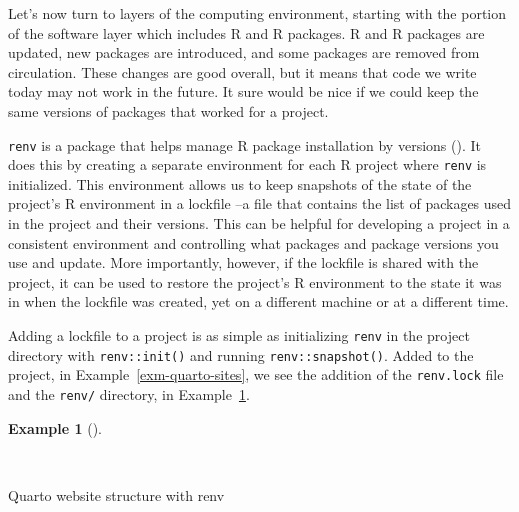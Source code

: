 \documentclass[
  letterpaper,
]{latex/krantz}
\theoremstyle{definition}
\newtheorem{example}{Example}[chapter]
\theoremstyle{remark}
\begin{document}
Let's now turn to layers of the computing environment, starting with the
portion of the software layer which includes R and R packages. R and R
packages are updated, new packages are introduced, and some packages are
removed from circulation. These changes are good overall, but it means
that code we write today may not work in the future. It sure would be
nice if we could keep the same versions of packages that worked for a
project.

\texttt{renv} is a package that helps manage R package installation by
versions (). It does this
by creating a separate environment for each R project where
\texttt{renv} is initialized. This environment allows us to keep
snapshots of the state of the project's R environment in a lockfile --a
file that contains the list of packages used in the project and their
versions. This can be helpful for developing a project in a consistent
environment and controlling what packages and package versions you use
and update. More importantly, however, if the lockfile is shared with
the project, it can be used to restore the project's R environment to
the state it was in when the lockfile was created, yet on a different
machine or at a different time.

Adding a lockfile to a project is as simple as initializing
\texttt{renv} in the project directory with \texttt{renv::init()} and
running \texttt{renv::snapshot()}. Added to the project, in
Example~\ref{exm-quarto-sites}, we see the addition of the
\texttt{renv.lock} file and the \texttt{renv/} directory, in
Example~\ref{exm-quarto-renv-site}.

\begin{example}[]\protect\hypertarget{exm-quarto-renv-site}{}\label{exm-quarto-renv-site}

~

\begin{codelisting}

\caption{\label{lst-quarto-renv}Quarto website structure with renv}


\end{codelisting}%

\end{example}
\end{document}
